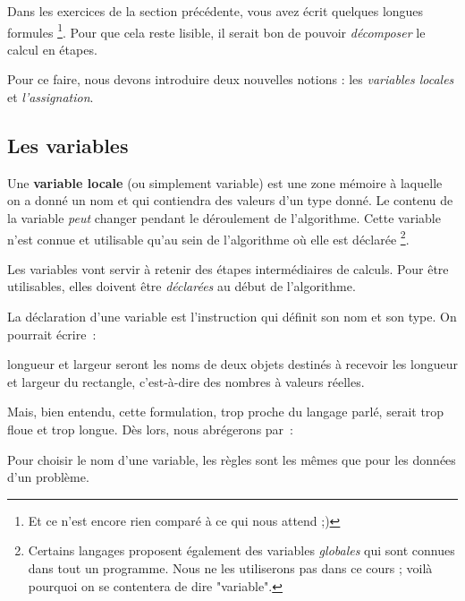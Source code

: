 		Dans les exercices de la section précédente,
		vous avez écrit quelques longues formules%
		\footnote{%
			Et ce n'est encore rien comparé à ce qui nous attend ;)%
		}.
		Pour que cela reste lisible,
		il serait bon de pouvoir \emph{décomposer}
		le calcul en étapes.
		
		Pour ce faire, nous devons introduire deux nouvelles notions :
		les \emph{variables locales} et \emph{l'assignation}.
		
		\subsection{Les variables}
		
			Une \textbf{variable locale} (ou simplement variable)
			est une zone mémoire à laquelle on a donné un nom
			et qui contiendra des valeurs d'un type donné.
			Le contenu de la variable \emph{peut} changer
			pendant le déroulement de l'algorithme.
			Cette variable n'est connue et utilisable qu'au sein
			de l'algorithme où elle est déclarée%
			\footnote{%
				Certains langages proposent également des variables
				\emph{globales} qui sont connues dans tout un programme.
				Nous ne les utiliserons pas dans ce cours ;
				voilà pourquoi on se contentera de dire "variable".%
			}.
			
			Les variables vont servir à retenir des étapes intermédiaires
			de calculs. 
			Pour être utilisables, elles doivent être \emph{déclarées}
			au début de l'algorithme. 
	
			La déclaration d’une variable 
			est l’instruction qui définit son nom et son type. 
			On pourrait écrire~:
	
			\begin{LDA}
				\Stmt longueur et largeur seront les noms de deux objets destinés à recevoir
				\Stmt les longueur et largeur du rectangle, c’est-à-dire des nombres à valeurs réelles.
			\end{LDA}
			
			Mais, bien entendu, cette formulation, trop proche du
			langage parlé, serait trop floue et trop longue. 
			Dès lors, nous abrégerons par~:
	
			\begin{LDA}
				\Decl{longueur, largeur}{réels}
			\end{LDA}
			
			Pour choisir le nom d'une variable,
			les règles sont les mêmes que pour les données d'un problème.
	
